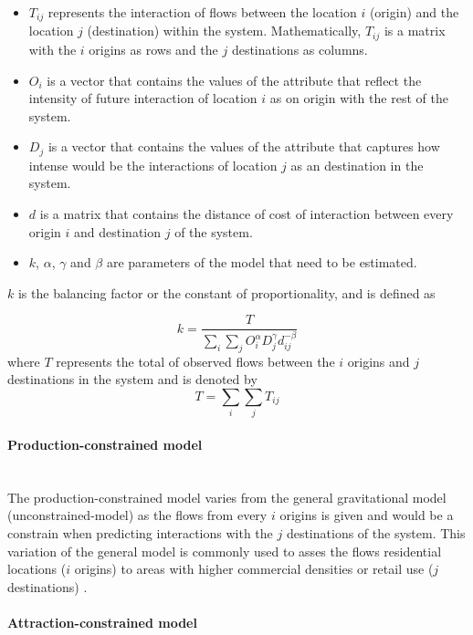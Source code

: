 \documentclass{article}
\begin{document}
\begin{itemize}
  \item $T_{ij}$ represents the interaction of flows between the location $i$ (origin) and the location $j$ (destination) within the system. Mathematically,  $T_{ij}$ is a matrix with the $i$ origins as rows and the $j$ destinations as columns.
  \item $O_{i}$ is a vector that contains the values of the attribute that reflect the intensity of future interaction of location $i$ as on origin with the rest of the system.
  \item $D_{j}$ is a vector that contains the values of the attribute that captures how intense would be the interactions of location $j$ as an destination in the system.
    \item $d$ is a matrix that contains the distance of cost of interaction between every origin $i$ and destination $j$ of the system.
    \item $k$, $\alpha$, $\gamma$ and $\beta$ are parameters of the model that need to be estimated.
\end{itemize}

$k$ is the balancing factor or the constant of proportionality, and is defined as

\[k = \frac{T}{\sum_i \sum_j O_i^\alpha  D_j^\gamma  d_{ij}^{-\beta}}\] where $T$ represents the total of observed flows between the $i$ origins and $j$ destinations in the system and is denoted by \[T= \sum_i \sum_j T_{ij}\]
\paragraph{Production-constrained model}\mbox{}\\

The production-constrained model varies from the general gravitational model (unconstrained-model) as the flows from every $i$ origins is given and would be a constrain when predicting interactions with the $j$ destinations of the system. This variation of the general model is commonly used to asses the flows residential locations ($i$ origins) to areas with higher commercial densities or retail use ($j$ destinations) \citep{wilkinsonSpatialInteractionModelling2023}.

\paragraph{Attraction-constrained model}\mbox{}\\
\end{document}

